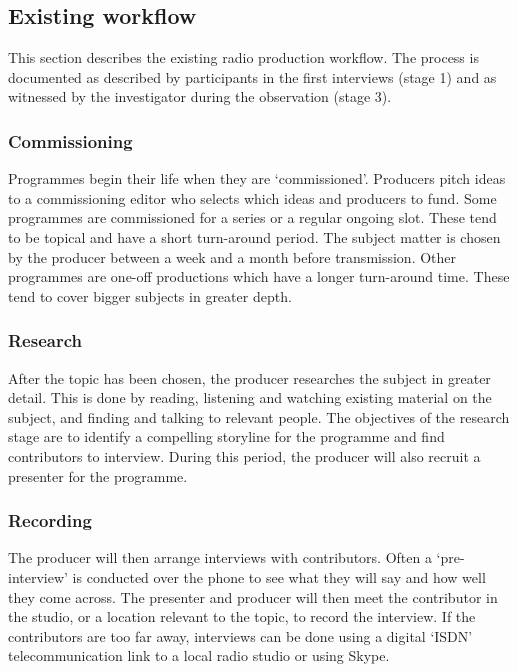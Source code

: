 
\subsection{Existing workflow}
This section describes the existing radio production workflow. The process is
documented as described by participants in the first interviews (stage 1) and as
witnessed by the investigator during the observation (stage 3).

\subsubsection{Commissioning}
Programmes begin their life when they are `commissioned'. Producers pitch ideas
to a commissioning editor who selects which ideas and producers to fund. Some
programmes are commissioned for a series or a regular ongoing slot. These tend
to be topical and have a short turn-around period. The subject matter is chosen
by the producer between a week and a month before transmission. Other
programmes are one-off productions which have a longer turn-around time. These
tend to cover bigger subjects in greater depth.

\subsubsection{Research}
After the topic has been chosen, the producer researches the subject in greater
detail. This is done by reading, listening and watching existing material on
the subject, and finding and talking to relevant people. The objectives of the
research stage are to identify a compelling storyline for the programme and
find contributors to interview. During this period, the producer will also
recruit a presenter for the programme.

\subsubsection{Recording}
The producer will then arrange interviews with contributors. Often a
`pre-interview' is conducted over the phone to see what they will say and how
well they come across. The presenter and producer will then meet the contributor
in the studio, or a location relevant to the topic, to record the interview. If
the contributors are too far away, interviews can be done using a digital
`ISDN' telecommunication link to a local radio studio or using Skype.

